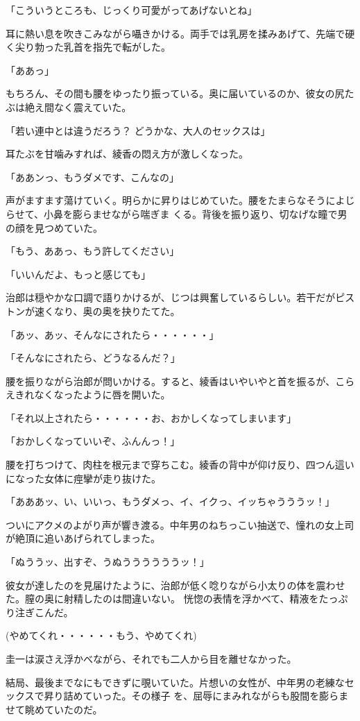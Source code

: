 ﻿\documentclass[book,tate]{jlreq}
\begin{document}
「こういうところも、じっくり可愛がってあげないとね」

耳に熱い息を吹きこみながら囁きかける。両手では乳房を揉みあげて、先端で硬く尖り勃った乳首を指先で転がした。

「ああっ」

もちろん、その間も腰をゆったり振っている。奥に届いているのか、彼女の尻たぶは絶え間なく震えていた。

「若い連中とは違うだろう？ どうかな、大人のセックスは」

耳たぶを甘噛みすれば、綾香の悶え方が激しくなった。

「ああンっ、もうダメです、こんなの」

声がますます蕩けていく。明らかに昇りはじめていた。腰をたまらなそうによじらせて、小鼻を膨らませながら喘ぎま くる。背後を振り返り、切なげな瞳で男の顔を見つめていた。

「もう、ああっ、もう許してください」

「いいんだよ、もっと感じても」

治郎は穏やかな口調で語りかけるが、じつは興奮しているらしい。若干だがピストンが速くなり、奥の奥を抉りたてた。

「あッ、あッ、そんなにされたら・・・・・・」

「そんなにされたら、どうなるんだ？」

腰を振りながら治郎が問いかける。すると、綾香はいやいやと首を振るが、こらえきれなくなったように唇を開いた。

「それ以上されたら・・・・・・お、おかしくなってしまいます」

「おかしくなっていいぞ、ふんんっ！」

腰を打ちつけて、肉柱を根元まで穿ちこむ。綾香の背中が仰け反り、四つん這いになった女体に痙攣が走り抜けた。

「あああッ、い、いいっ、もうダメっ、イ、イクっ、イッちゃうううッ！」

ついにアクメのよがり声が響き渡る。中年男のねちっこい抽送で、憧れの女上司が絶頂に追いあげられてしまった。

「ぬううッ、出すぞ、うぬううううううッ！」

彼女が達したのを見届けたように、治郎が低く唸りながら小太りの体を震わせた。膣の奥に射精したのは間違いない。 恍惚の表情を浮かべて、精液をたっぷり注ぎこんだ。

(やめてくれ・・・・・・もう、やめてくれ)

圭一は涙さえ浮かべながら、それでも二人から目を離せなかった。

結局、最後までなにもできずに覗いていた。片想いの女性が、中年男の老練なセックスで昇り詰めていった。その様子 を、屈辱にまみれながらも股間を膨らませて眺めていたのだ。
\end{document}
